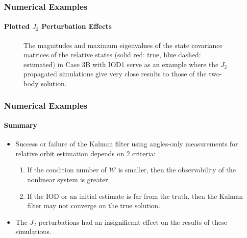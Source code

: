 \documentclass[hyperref={pdftex,pdfpagemode=none,pdfstartview=FitH},10pt]{beamer}
\begin{document}
\begin{frame}
\setcounter{subfigure}{0}
\frametitle{Numerical Examples}
\framesubtitle{Plotted $J_2$ Perturbation Effects}


\begin{figure}[h]
\centerline{
\hspace*{0.07\textwidth}
}
\centerline{
\hspace*{0.07\textwidth}
}
\caption{The magnitudes and maximum eigenvalues of the state covariance matrices of the relative states (solid red: true, blue dashed: estimated) in Case 3B with IOD1 serve as an example where the $J_2$ propagated simulations give very close results to those of the two-body solution.
}\label{fig:TBPvsJ2}
\end{figure}

\end{frame}


\begin{frame}
\frametitle{Numerical Examples}
\framesubtitle{Summary}

\begin{itemize}
\item Success or failure of the Kalman filter using angles-only measurements for relative orbit estimation depends on 2 criteria:
\begin{enumerate}
\item If the condition number of $\mathcal{W}$ is smaller, then the observability of the nonlinear system is greater.
\item If the IOD or an initial estimate is far from the truth, then the Kalman filter may not converge on the true solution.
\end{enumerate}
\item The $J_2$ perturbations had an insignificant effect on the results of these simulations.
\end{itemize}

\end{frame}
\end{document}
